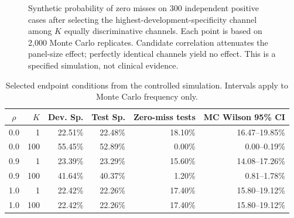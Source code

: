 \documentclass{ieeeaccess}
\begin{document}
\begin{figure}[t]
\centering
{}
\caption{Synthetic probability of zero misses on 300 independent positive cases after selecting the highest-development-specificity channel among $K$ equally discriminative channels. Each point is based on 2,000 Monte Carlo replicates. Candidate correlation attenuates the panel-size effect; perfectly identical channels yield no effect. This is a specified simulation, not clinical evidence.}
\label{fig:panel-simulation}
\end{figure}

\begin{table}[t]
\centering
\caption{Selected endpoint conditions from the controlled simulation. Intervals apply to Monte Carlo frequency only.}
\label{tab:panel-simulation}
\footnotesize
\setlength{\tabcolsep}{3pt}
\begin{tabular}{crrrrr}
\toprule
$\rho$ & $K$ & Dev. Sp. & Test Sp. & Zero-miss tests & MC Wilson 95\% CI \\
\midrule
0.0 & 1 & 22.51\% & 22.48\% & 18.10\% & 16.47--19.85\% \\
0.0 & 100 & 55.45\% & 52.89\% & 0.00\% & 0.00--0.19\% \\
0.9 & 1 & 23.39\% & 23.29\% & 15.60\% & 14.08--17.26\% \\
0.9 & 100 & 41.64\% & 40.37\% & 1.20\% & 0.81--1.78\% \\
1.0 & 1 & 22.42\% & 22.26\% & 17.40\% & 15.80--19.12\% \\
1.0 & 100 & 22.42\% & 22.26\% & 17.40\% & 15.80--19.12\% \\
\bottomrule
\end{tabular}
\end{table}
\end{document}
